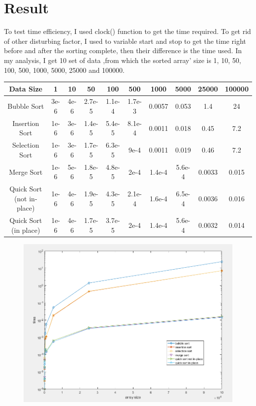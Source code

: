 \documentclass[12pt]{article}
\begin{document}
\section{Result}
To test time efficiency, I used clock() function to get the time required. To get rid of other disturbing factor, I used to variable start and stop to get the time right before and after the sorting complete, then their difference is the time used. In my analysis, I get 10 set of data ,from which the sorted array' size is 1, 10, 50, 100, 500, 1000, 5000, 25000 and 100000.
\begin{table}[H]
\centering
\begin{tabular}{|c|c|c|c|c|c|c|c|c|c|}
\hline
Data Size                 & 1    & 10   & 50     & 100    & 500    & 1000   & 5000   & 25000  & 100000 \\ \hline
Bubble Sort               & 3e-6 & 4e-6 & 2.7e-5 & 1.1e-4 & 1.7e-3 & 0.0057 & 0.053  & 1.4    & 24     \\ \hline
Insertion Sort            & 1e-6 & 3e-6 & 1.4e-5 & 5.4e-5 & 8.1e-4 & 0.0011 & 0.018  & 0.45   & 7.2    \\ \hline
Selection Sort            & 1e-6 & 3e-6 & 1.7e-5 & 6.3e-5 & 9e-4   & 0.0011 & 0.019  & 0.46   & 7.2    \\ \hline
Merge Sort                & 1e-6 & 5e-6 & 1.8e-5 & 4.8e-5 & 2e-4   & 1.4e-4 & 5.6e-4 & 0.0033 & 0.015  \\ \hline
Quick Sort (not in-place) & 1e-6 & 4e-6 & 1.9e-5 & 4.3e-5 & 2.1e-4 & 1.6e-4 & 6.5e-4 & 0.0036 & 0.016  \\ \hline
Quick Sort (in place)     & 1e-6 & 4e-6 & 1.7e-5 & 3.7e-5 & 2e-4   & 1.4e-4 & 5.6e-4 & 0.0032 & 0.014  \\ \hline
\end{tabular}
\end{table}
\begin{figure}[H]
\centering
\includegraphics[scale=0.55]{P2.png}
\end{figure}
\end{document}

